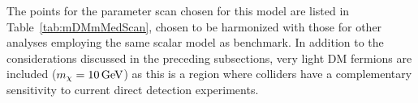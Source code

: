 The points for the parameter scan chosen for this model are listed in Table~\ref{tab:mDMmMedScan}, chosen
to be harmonized with those for other analyses employing the same scalar model as benchmark. In addition to the considerations discussed in the preceding subsections, very light DM fermions are included ($m_{\chi}=10\,{\rm GeV}$) as this is a region where colliders have a complementary sensitivity to current direct detection experiments. 
% 
% 
